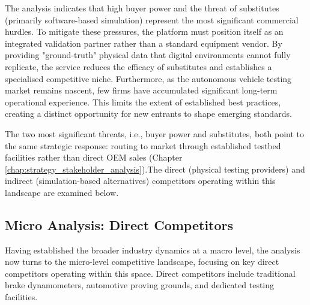 \documentclass[11pt, a4paper]{report}
\numberwithin{equation}{section}
\begin{document}
\begin{refsection}
The analysis indicates that high buyer power and the threat of substitutes (primarily software-based simulation) represent the most significant commercial hurdles. To mitigate these pressures, the platform must position itself as an integrated validation partner rather than a standard equipment vendor. By providing "ground-truth" physical data that digital environments cannot fully replicate, the service reduces the efficacy of substitutes and establishes a specialised competitive niche. Furthermore, as the autonomous vehicle testing market remains nascent, few firms have accumulated significant long-term operational experience. This limits the extent of established best practices, creating a distinct opportunity for new entrants to shape emerging standards.

The two most significant threats, i.e., buyer power and substitutes, both point to the same strategic response: routing to market through established testbed facilities rather than direct OEM sales (Chapter \ref{chap:strategy_stakeholder_analysis}).The direct (physical testing providers) and indirect (simulation-based alternatives) competitors operating within this landscape are examined below.

\subsection{Micro Analysis: Direct Competitors}

Having established the broader industry dynamics at a macro level, the analysis now turns to the micro-level competitive landscape, focusing on key direct competitors operating within this space. Direct competitors include traditional brake dynamometers, automotive proving grounds, and dedicated testing facilities. 


\end{refsection}
\end{document}
